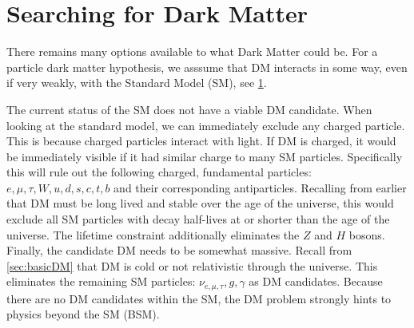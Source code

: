 \section{Searching for Dark Matter}\label{sec:dm_search}

There remains many options available to what Dark Matter could be.
For a particle dark matter hypothesis, we asssume that DM interacts in some way, even if very weakly, with the Standard Model (SM), see \cref{fig:SM}.
\begin{figure}[ht]
    \label{fig:SM}
\end{figure}
The current status of the SM does not have a viable DM candidate.
When looking at the standard model, we can immediately exclude any charged particle.
This is because charged particles interact with light.
If DM is charged, it would be immediately visible if it had similar charge to many SM particles.
Specifically this will rule out the following charged, fundamental particles: $e,\mu, \tau, W, u, d, s, c, t, b$ and their corresponding antiparticles.
Recalling from earlier that DM must be long lived and stable over the age of the universe, this would exclude all SM particles with decay half-lives at or shorter than the age of the universe.
The lifetime constraint additionally eliminates the $Z$ and $H$ bosons.
Finally, the candidate DM needs to be somewhat massive.
Recall from \cref{sec:basicDM} that DM is cold or not relativistic through the universe.
This eliminates the remaining SM particles: $\nu_{e, \mu, \tau}, g, \gamma$ as DM candidates.
Because there are no DM candidates within the SM, the DM problem strongly hints to physics beyond the SM (BSM).


